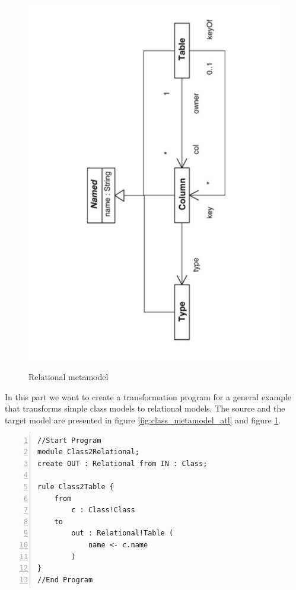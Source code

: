 \documentclass{llncs}
\begin{document}
\begin{figure}
	\centering
	\includegraphics[angle=270,width=1\textwidth,natwidth=610,natheight=642]{figures/Relational_metamodel.pdf}
	\caption{Relational metamodel}\cite{atl:frederic}
	\label{fig:relational_metamodel_atl}
\end{figure}

In this part we want to create a transformation program for a general example
that transforms simple class models to relational models. The source and the
target model are presented in figure \ref{fig:class_metamodel_atl} and figure 
\ref{fig:relational_metamodel_atl}.

\begin{lstlisting}[language=ATL, numbers=left,xleftmargin=5.0ex, caption=Simple example for a ATL transformation, label=lst:shortexample]
//Start Program
module Class2Relational;
create OUT : Relational from IN : Class;

rule Class2Table {
	from
		c : Class!Class
	to 
		out : Relational!Table (
			name <- c.name
		)
}
//End Program
\end{lstlisting}
\end{document}
